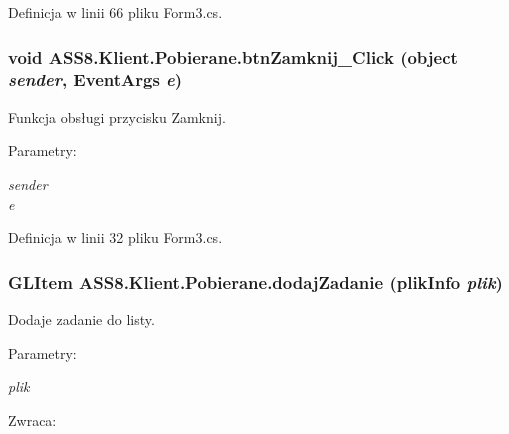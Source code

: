 Definicja w linii 66 pliku Form3.cs.\hypertarget{a00019_5c793ae5ccd31fe4509468eebfdc76b9}{
\subsubsection[{btnZamknij\_\-Click}]{\setlength{\rightskip}{0pt plus 5cm}void ASS8.Klient.Pobierane.btnZamknij\_\-Click (object {\em sender}, \/  EventArgs {\em e})}}
\label{dd/da2/a00019_5c793ae5ccd31fe4509468eebfdc76b9}


Funkcja obsługi przycisku Zamknij. 

\begin{Desc}
\item[Parametry:]
\begin{description}
\item[{\em sender}]\item[{\em e}]\end{description}
\end{Desc}


Definicja w linii 32 pliku Form3.cs.\hypertarget{a00019_342268ebdae71abcd09819bba08f0f88}{
\subsubsection[{dodajZadanie}]{\setlength{\rightskip}{0pt plus 5cm}GLItem ASS8.Klient.Pobierane.dodajZadanie ({\bf plikInfo} {\em plik})}}
\label{dd/da2/a00019_342268ebdae71abcd09819bba08f0f88}


Dodaje zadanie do listy. 

\begin{Desc}
\item[Parametry:]
\begin{description}
\item[{\em plik}]\end{description}
\end{Desc}
\begin{Desc}
\item[Zwraca:]\end{Desc}



